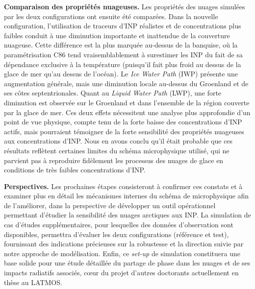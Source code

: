 \medskip
\noindent
\textbf{Comparaison des propriétés nuageuses.}  
Les propriétés des nuages simulées par les deux configurations ont ensuite été comparées.  
Dans la nouvelle configuration, l’utilisation de traceurs d’INP réalistes et de concentrations plus faibles conduit à une diminution importante et inattendue de la couverture nuageuse.  
Cette différence est la plus marquée au-dessus de la banquise, où la paramétrisation C86 tend vraisemblablement à surestimer les INP du fait de sa dépendance exclusive à la température (puisqu'il fait plus froid au dessus de la glace de mer qu'au dessus de l'océan).  
Le \textit{Ice Water Path} (IWP) présente une augmentation générale, mais une diminution locale au-dessus du Groenland et de ses côtes septentrionales.  
Quant au \textit{Liquid Water Path} (LWP), une forte diminution est observée sur le Groenland et dans l’ensemble de la région couverte par la glace de mer.  
Ces deux effets nécessitent une analyse plus approfondie d’un point de vue physique, compte tenu de la forte baisse des concentrations d’INP actifs, mais pourraient témoigner de la forte sensibilité des propriétés nuageuses aux concentrations d'INP.
Nous en avons conclu qu’il était probable que ces résultats reflètent certaines limites du schéma microphysique utilisé, qui ne parvient pas à reproduire fidèlement les processus des nuages de glace en conditions de très faibles concentrations d’INP.

\medskip
\noindent
\textbf{Perspectives.}  
Les prochaines étapes consisteront à confirmer ces constats et à examiner plus en détail les mécanismes internes du schéma de microphysique afin de l’améliorer, dans la perspective de développer un outil opérationnel permettant d’étudier la sensibilité des nuages arctiques aux INP.  
La simulation de cas d'études supplémentaires, pour lesquelles des données d’observation sont disponibles, permettra d’évaluer les deux configurations (référence et test), fournissant des indications précieuses sur la robustesse et la direction suivie par notre approche de modélisation.  
Enfin, ce \textit{set-up} de simulation constituera une base solide pour une étude détaillée du partage de phase dans les nuages et de ses impacts radiatifs associés, c\oe ur du projet d’autres doctorants actuellement en thèse au LATMOS.

%

